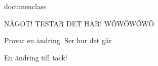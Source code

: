 {documenclass}

NÅGOT! TESTAR DET HÄR! WÖWÖWÖWÖ

Provar en ändring. Ser hur det går

En ändring till tack!
